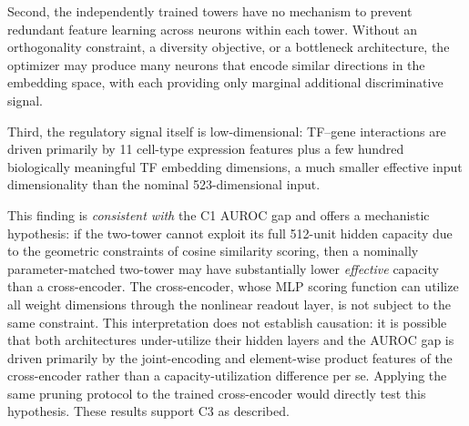 \documentclass[journal]{IEEEtran}
\begin{document}
Second, the independently trained towers have no mechanism to prevent redundant
feature learning across neurons within each tower. Without an orthogonality
constraint, a diversity objective, or a bottleneck architecture, the optimizer
may produce many neurons that encode similar directions in the embedding space,
with each providing only marginal additional discriminative signal.

Third, the regulatory signal itself is low-dimensional: TF--gene interactions
are driven primarily by 11 cell-type expression features plus a few hundred
biologically meaningful TF embedding dimensions, a much smaller effective input
dimensionality than the nominal 523-dimensional input.

This finding is \emph{consistent with} the C1 AUROC gap and offers a
mechanistic hypothesis: if the two-tower cannot exploit its full 512-unit
hidden capacity due to the geometric constraints of cosine similarity scoring,
then a nominally parameter-matched two-tower may have substantially lower
\emph{effective} capacity than a cross-encoder. The cross-encoder, whose MLP
scoring function can utilize all weight dimensions through the nonlinear
readout layer, is not subject to the same constraint. This interpretation
does not establish causation: it is possible that both architectures
under-utilize their hidden layers and the AUROC gap is driven primarily by
the joint-encoding and element-wise product features of the cross-encoder
rather than a capacity-utilization difference per se. Applying the same
pruning protocol to the trained cross-encoder would directly test this
hypothesis. These results support C3 as described.
\end{document}
